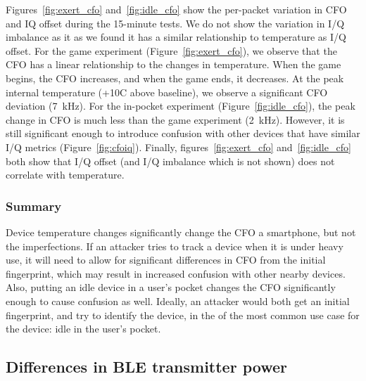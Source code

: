 Figures~\ref{fig:exert_cfo} and~\ref{fig:idle_cfo} show the per-packet
variation in CFO and IQ offset during the 15-minute tests. We do not show the
variation in I/Q imbalance as it as we found it has a similar relationship to
temperature as I/Q offset. 
%
For the game experiment (Figure~\ref{fig:exert_cfo}), we observe that the CFO
has a linear relationship to the changes in
temperature. When the game begins, the CFO increases, and when the game ends, it decreases.
At the peak internal temperature (+10\textdegree C above baseline),
we observe a significant CFO deviation (7~kHz).
%
%
For the in-pocket experiment (Figure~\ref{fig:idle_cfo}), the peak change in CFO is much
less than the game experiment (2~kHz). However, it is
still significant enough to introduce confusion with other devices that have
similar I/Q metrics (Figure~\ref{fig:cfoiq}).
Finally, figures~\ref{fig:exert_cfo} and~\ref{fig:idle_cfo} both show that I/Q offset
(and I/Q imbalance which is not shown) does not correlate with
temperature.

\subsubsection*{Summary} 
Device temperature changes significantly change the CFO
a smartphone, but not the \iq imperfections. If an attacker tries to track a device when it is under
heavy use, it will need to allow for significant differences in CFO from the
initial fingerprint, which may result in increased confusion with other nearby
devices. Also, putting an idle device in a user's pocket changes the CFO
significantly enough to cause confusion as well.  Ideally, an attacker would
both get an initial fingerprint, and try to identify the device, in the of the most common use case for the device: idle in
the user's pocket. 


\subsection{Differences in BLE transmitter power} %

